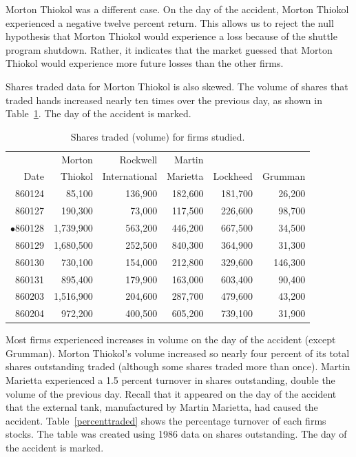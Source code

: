 Morton Thiokol was a different case. On the day of the accident, Morton Thiokol experienced a negative twelve percent return. This allows us to reject the null hypothesis that Morton Thiokol would experience a loss because of the shuttle program shutdown. Rather, it indicates that the market guessed that Morton Thiokol would experience more future losses than the other firms.

Shares traded data for Morton Thiokol is also skewed. The volume of shares that traded hands increased nearly ten times over the previous day, as shown in Table~\ref{volume}. The day of the accident is marked.

\begin{table}[h!]
\caption{Shares traded (volume) for firms studied.}
\sffamily
\begin{tabular*}{6in}{r@{\extracolsep{1em}}rrrrr}
\hline\hline       
       &  Morton & Rockwell & Martin &          &         \\
Date   &  Thiokol & International & Marietta & Lockheed & Grumman \\
\hline
860124 & 85,100 & 136,900 & 182,600 & 181,700 & 26,200 \\
860127 & 190,300 & 73,000 & 117,500 & 226,600 & 98,700 \\
$\bullet$860128 & 1,739,900 & 563,200 & 446,200 & 667,500 & 34,500 \\
860129 & 1,680,500 & 252,500 & 840,300 & 364,900 & 31,300 \\
860130 & 730,100 & 154,000 & 212,800 & 329,600 & 146,300 \\
860131 & 895,400 & 179,900 & 163,000 & 603,400 & 90,400 \\
860203 & 1,516,900 & 204,600 & 287,700 & 479,600 & 43,200 \\
860204 & 972,200 & 400,500 & 605,200 & 739,100 & 31,900 \\ \hline
\end{tabular*}
\label{volume}
\end{table}

Most firms experienced increases in volume on the day of the accident (except Grumman). Morton Thiokol's volume increased so nearly four percent of its total shares outstanding traded (although some shares traded more than once). Martin Marietta experienced a 1.5 percent turnover in shares outstanding, double the volume of the previous day. Recall that it appeared on the day of the accident that the external tank, manufactured by Martin Marietta, had caused the accident. Table~\ref{percenttraded} shows the percentage turnover of each firms stocks. The table was created using 1986 data on shares outstanding. The day of the accident is marked.

